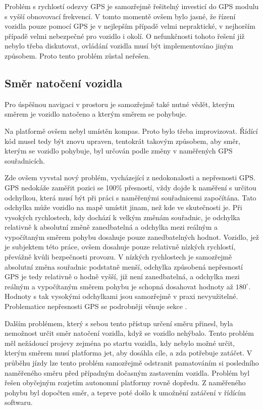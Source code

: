 \documentclass[czech, bachelor]{diploma}
\begin{document}
Problém s rychlostí odezvy GPS je samozřejmě řešitelný investicí do GPS modulu s vyšší obnovovací frekvencí. V tomto momentě ovšem
bylo jasné, že řízení vozidla pouze pomocí GPS je v nejlepším případě velmi nepraktické, v nejhorším případě velmi nebezpečné
pro vozidlo i okolí. O nefunkčnosti tohoto řešení již nebylo třeba diskutovat, ovládání vozidla musí být implementováno jiným
způsobem. Proto tento problém zůstal neřešen.

\subsection{Směr natočení vozidla} \label{directions-and-angles}

Pro úspěšnou navigaci v prostoru je samozřejmě také nutné vědět, kterým směrem je vozidlo natočeno a kterým směrem se pohybuje.

Na platformě ovšem nebyl umístěn kompas. Proto bylo třeba improvizovat. Řídící kód musel tedy být znovu upraven, tentokrát takovým
způsobem, aby směr, kterým se vozidlo pohybuje, byl určován podle změny v naměřených GPS souřadnicích.

Zde ovšem vyvstal nový problém, vycházející z nedokonalosti a nepřesnosti GPS. GPS nedokáže zaměřit pozici se 100\% přesností,
vždy dojde k naměření s určitou odchylkou, která musí být při práci s naměřenými souřadnicemi započítána. Tato odchylka může
vozidlo na mapě umístit jinam, než kde ve skutečnosti je. Při vysokých rychlostech, kdy dochází k velkým změnám souřadnic,
je odchylka relativně k absolutní změně zanedbatelná a odchylka mezi reálným a vypočítaným směrem pohybu dosahuje pouze
zanedbatelných hodnot. Vozidlo, jež je subjektem této práce, ovšem dosahuje pouze relativně nízkých rychlostí, převážně kvůli
bezpečnosti provozu. V nízkých rychlostech je samozřejmě absolutní změna souřadnic podstatně menší, odchylka způsobená nepřesností
GPS je tedy relativně o hodně vyšší, již není zanedbatelná, a odchylka mezi reálným a vypočítaným směrem pohybu je schopná
dosahovat hodnoty až $180^{\circ}$. Hodnoty s tak vysokými odchylkami jsou samozřejmě v praxi nevyužitelné. Problematice
nepřesnosti GPS se podrobněji věnuje sekce .

Dalším problémem, který s sebou tento přístup určení směru přinesl, byla nemožnost určit směr natočení vozidla, když se vozidlo
nehýbalo. Tento problém měl nežádoucí projevy zejména po startu vozidla, kdy nebylo možné určit, kterým směrem musí platforma jet,
aby dosáhla cíle, a zda potřebuje zatáčet. V průběhu jízdy lze tento problém samozřejmě odstranit pamatováním si posledního
naměřeného směru před případným dočasným zastavením vozidla. Problém byl řešen obyčejným rozjetím autonomní platformy rovně
dopředu. Z naměřeného pohybu byl dopočten směr, a teprve poté došlo k umožnění zatáčení v řídícím softwaru.
\end{document}
